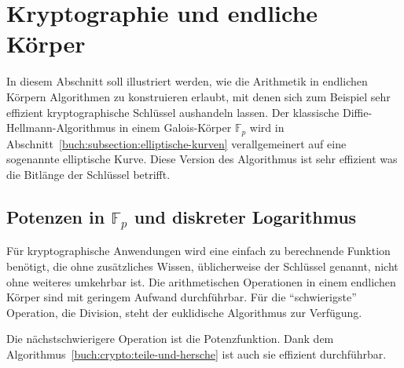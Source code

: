 %
%
%

\section{Kryptographie und endliche Körper
\label{buch:section:kryptographie-und-endliche-koerper}}
In diesem Abschnitt soll illustriert werden, wie die Arithmetik in
endlichen Körpern Algorithmen zu konstruieren erlaubt, mit denen sich
zum Beispiel sehr effizient kryptographische Schlüssel aushandeln 
lassen.
Der klassische Diffie-Hellmann-Algorithmus in einem Galois-Körper
$\mathbb{F}_p$ wird in Abschnitt~\ref{buch:subsection:elliptische-kurven}
verallgemeinert auf eine sogenannte elliptische Kurve.
Diese Version des Algorithmus ist sehr effizient was die Bitlänge der
Schlüssel betrifft.

\subsection{Potenzen in $\mathbb{F}_p$ und diskreter Logarithmus
\label{buch:subsection:potenzen-diskreter-logarithmus}}
Für kryptographische Anwendungen wird eine einfach zu berechnende
Funktion benötigt,
die ohne zusätzliches Wissen, üblicherweise der Schlüssel genannt,
nicht ohne weiteres umkehrbar ist.
Die arithmetischen Operationen in einem endlichen Körper sind
mit geringem Aufwand durchführbar.
Für die ``schwierigste'' Operation, die Division, steht der
euklidische Algorithmus zur Verfügung.

Die nächstschwierigere Operation ist die Potenzfunktion.
Dank dem Algorithmus~\ref{buch:crypto:teile-und-hersche} ist auch
sie effizient durchführbar.

